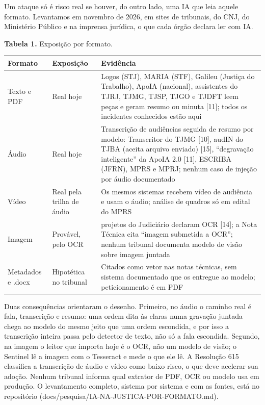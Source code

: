 \documentclass[
  brazilian,
  11pt,
]{article}
\newcounter{none} %
\begin{document}
Um ataque só é risco real se houver, do outro lado, uma IA que leia
aquele formato. Levantamos em novembro de 2026, em sites de tribunais,
do CNJ, do Ministério Público e na imprensa jurídica, o que cada órgão
declara ler com IA.

\textbf{Tabela 1.} Exposição por formato.

{\def\LTcaptype{none} %
\begin{longtable}[]{@{}
  >{\raggedright\arraybackslash}p{}
  >{\raggedright\arraybackslash}p{}
  >{\raggedright\arraybackslash}p{}@{}}
\toprule\noalign{}
\begin{minipage}[b]{\linewidth}\raggedright
Formato
\end{minipage} & \begin{minipage}[b]{\linewidth}\raggedright
Exposição
\end{minipage} & \begin{minipage}[b]{\linewidth}\raggedright
Evidência
\end{minipage} \\
\midrule\noalign{}
\endhead
\bottomrule\noalign{}
\endlastfoot
Texto e PDF & Real hoje & Logos (STJ), MARIA (STF), Galileu (Justiça do
Trabalho), ApoIA (nacional), assistentes do TJRJ, TJMG, TJSP, TJGO e
TJDFT leem peças e geram resumo ou minuta {[}11{]}; todos os incidentes
conhecidos estão aqui \\
Áudio & Real hoje & Transcrição de audiências seguida de resumo por
modelo: Transcritor do TJMG {[}10{]}, audIN do TJBA (aceita arquivo
enviado) {[}15{]}, ``degravação inteligente'' da ApoIA 2.0 {[}11{]},
ESCRIBA (JFRN), MPRS e MPRJ; nenhum caso de injeção por áudio
documentado \\
Vídeo & Real pela trilha de áudio & Os mesmos sistemas recebem vídeo de
audiência e usam o áudio; análise de quadros só em edital do MPRS \\
Imagem & Provável, pelo OCR & 26 projetos do Judiciário declaram OCR
{[}14{]}; a Nota Técnica cita ``imagem submetida a OCR''; nenhum
tribunal documenta modelo de visão sobre imagem juntada \\
Metadados e .docx & Hipotética no tribunal & Citados como vetor nas
notas técnicas, sem sistema documentado que os entregue ao modelo;
peticionamento é em PDF \\
\end{longtable}
}

Duas consequências orientaram o desenho. Primeiro, no áudio o caminho
real é fala, transcrição e resumo: uma ordem dita às claras numa
gravação juntada chega ao modelo do mesmo jeito que uma ordem escondida,
e por isso a transcrição inteira passa pelo detector de texto, não só a
fala escondida. Segundo, na imagem o leitor que importa hoje é o OCR,
não um modelo de visão; o Sentinel lê a imagem com o Tesseract e mede o
que ele lê. A Resolução 615 classifica a transcrição de áudio e vídeo
como baixo risco, o que deve acelerar sua adoção. Nenhum tribunal
informa qual extrator de PDF, OCR ou modelo usa em produção. O
levantamento completo, sistema por sistema e com as fontes, está no
repositório (docs/pesquisa/IA-NA-JUSTICA-POR-FORMATO.md).
\end{document}
